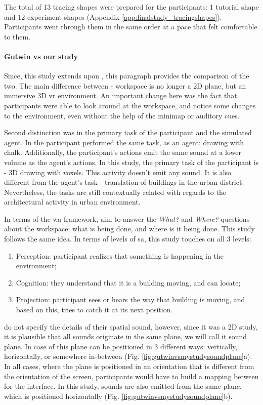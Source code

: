 The total of 13 tracing shapes were prepared for the participants: 1 tutorial shape and 12 experiment shapes (Appendix \ref{app:finalstudy_tracingshapes}).
Participants went through them in the same order at a pace that felt comfortable to them.

\paragraph{Gutwin vs our study}
Since, this study extends upon \cite{gutwin_chalk_2011}, this paragraph provides the comparison of the two.
The main difference between - workspace is no longer a 2D plane, but an immersive 3D \gls{vr} environment. An important change here was the fact that participants were able to look around at the workspace, and notice some changes to the environment, even without the help of the minimap or auditory cues. 

Second distinction was in the primary task of the participant and the simulated agent. In \cite{gutwin_chalk_2011} the participant performed the same task, as an agent: drawing with chalk. Additionally, the participant's actions emit the same sound at a lower volume as the agent's actions. In this study, the primary task of the participant is - 3D drawing with voxels. This activity doesn't emit any sound. It is also different from the agent's task - translation of buildings in the urban district. Nevertheless, the tasks are still contextually related with regards to the architectural activity in urban environment.

In terms of the \gls{wa} framework, \cite{gutwin_chalk_2011} aim to answer the \textit{What?} and \textit{Where?} questions about the workspace: what is being done, and where is it being done. This study follows the same idea. In terms of levels of \gls{sa}, this study touches on all 3 levels: 
\begin{enumerate}
	\item Perception: participant realizes that something is happening in the environment;
	\item Cognition: they understand that it is a building moving, and can locate;
	\item Projection: participant sees or hears the way that building is moving, and based on this, tries to catch it at its next position.
\end{enumerate}

\cite{gutwin_chalk_2011} do not specify the details of their spatial sound, however, since it was a 2D study, it is plausible that all sounds originate in the same plane, we will call it sound plane. In case of \cite{gutwin_chalk_2011} this plane can be positioned in 3 different ways: vertically, horizontally, or somewhere in-between (Fig. \ref{fig:gutwinvsmystudysoundplane}a). In all cases, where the plane is positioned in an orientation that is different from the orientation of the screen, participants would have to build a mapping between for the interface. In this study, sounds are also emitted from the same plane, which is positioned horizontally (Fig. \ref{fig:gutwinvsmystudysoundplane}b).


